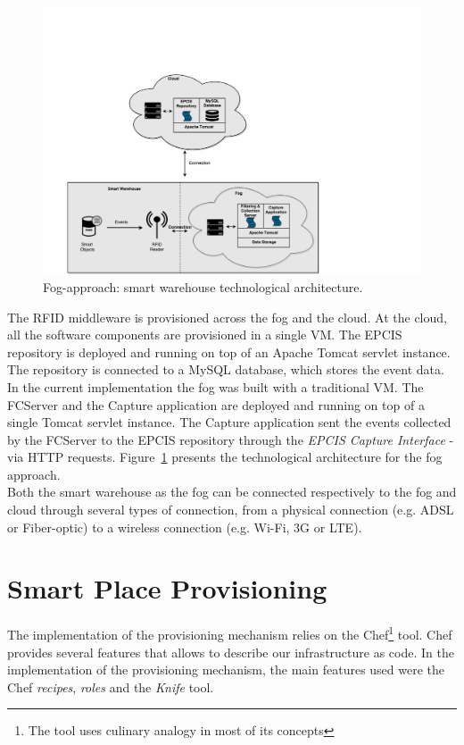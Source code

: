 \begin{figure}
  \centering
  \includegraphics[width=\textwidth]{./images/implementation_fog_architecture}
  \caption[Fog-approach: technological architecture.]{Fog-approach: smart warehouse technological architecture.}
  \label{fig:implementation_fog_architecture}
\end{figure}

The \gls{RFID} middleware is provisioned across the fog and the cloud. At the cloud,
all the software components are provisioned in a single \gls{VM}. The \gls{EPCIS} repository is deployed
and running on top of an Apache Tomcat servlet instance. The repository is connected to a MySQL
database, which stores the event data. In the current implementation the fog was built with a traditional
\gls{VM}. The \gls{FCServer} and the Capture application are deployed and running on top of a single
Tomcat servlet instance. The Capture application sent the events collected by the \gls{FCServer} to
the \gls{EPCIS} repository through the \textit{\gls{EPCIS} Capture Interface} - via \gls{HTTP} requests.
Figure~\ref{fig:implementation_fog_architecture} presents the technological architecture for the fog
approach.\\

Both the smart warehouse as the fog can be connected respectively to the fog and cloud through several
types of connection, from a physical connection (e.g. \gls{ADSL} or Fiber-optic) to a wireless connection
(e.g. Wi-Fi, 3G or \gls{LTE}).

\section{Smart Place Provisioning}
\label{sec:impl_provisioning}
The implementation of the provisioning mechanism relies on the Chef\footnote{The tool uses culinary
analogy in most of its concepts} tool. Chef provides several features that allows to describe our
infrastructure as code. In the implementation of the provisioning mechanism, the main features used
were the Chef \textit{recipes}, \textit{roles} and the \textit{Knife} tool.

